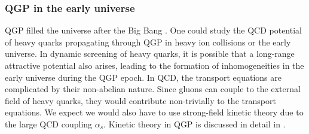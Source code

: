 \subsubsection{QGP in the early universe}
 QGP filled the universe  after the Big Bang \cite{Rafelski:2013yka}. One could study the QCD potential of heavy quarks propagating through QGP in heavy ion collisions or the early universe. In dynamic screening of heavy quarks, it is possible that a long-range attractive potential also arises, leading to the formation of inhomogeneities in the early universe during the QGP epoch. In QCD, the transport equations are complicated by their non-abelian nature. Since gluons can couple to the external field of heavy quarks, they would contribute non-trivially to the transport equations. We expect we would also have to use strong-field kinetic theory due to the large QCD coupling $\alpha_s$. Kinetic theory in QGP is discussed in detail in \cite{Mrowczynski:2016etf}.
